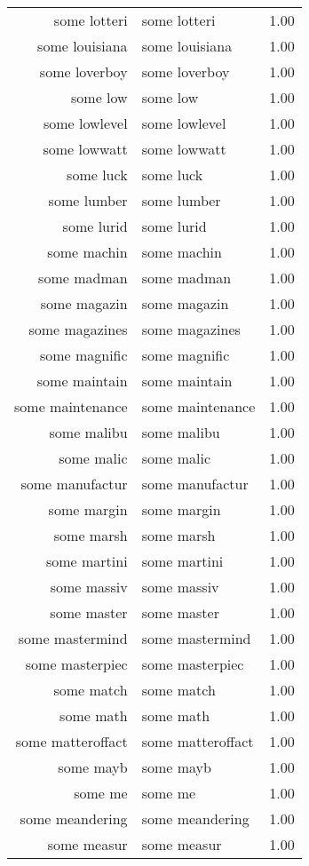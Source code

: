 \begin{table}[ht]
\begin{tabular}{rlr}
  some lotteri & some lotteri & 1.00 \\ 
  some louisiana & some louisiana & 1.00 \\ 
  some loverboy & some loverboy & 1.00 \\ 
  some low & some low & 1.00 \\ 
  some lowlevel & some lowlevel & 1.00 \\ 
  some lowwatt & some lowwatt & 1.00 \\ 
  some luck & some luck & 1.00 \\ 
  some lumber & some lumber & 1.00 \\ 
  some lurid & some lurid & 1.00 \\ 
  some machin & some machin & 1.00 \\ 
  some madman & some madman & 1.00 \\ 
  some magazin & some magazin & 1.00 \\ 
  some magazines & some magazines & 1.00 \\ 
  some magnific & some magnific & 1.00 \\ 
  some maintain & some maintain & 1.00 \\ 
  some maintenance & some maintenance & 1.00 \\ 
  some malibu & some malibu & 1.00 \\ 
  some malic & some malic & 1.00 \\ 
  some manufactur & some manufactur & 1.00 \\ 
  some margin & some margin & 1.00 \\ 
  some marsh & some marsh & 1.00 \\ 
  some martini & some martini & 1.00 \\ 
  some massiv & some massiv & 1.00 \\ 
  some master & some master & 1.00 \\ 
  some mastermind & some mastermind & 1.00 \\ 
  some masterpiec & some masterpiec & 1.00 \\ 
  some match & some match & 1.00 \\ 
  some math & some math & 1.00 \\ 
  some matteroffact & some matteroffact & 1.00 \\ 
  some mayb & some mayb & 1.00 \\ 
  some me & some me & 1.00 \\ 
  some meandering & some meandering & 1.00 \\ 
  some measur & some measur & 1.00 \\ 

\end{tabular}
\end{table}
